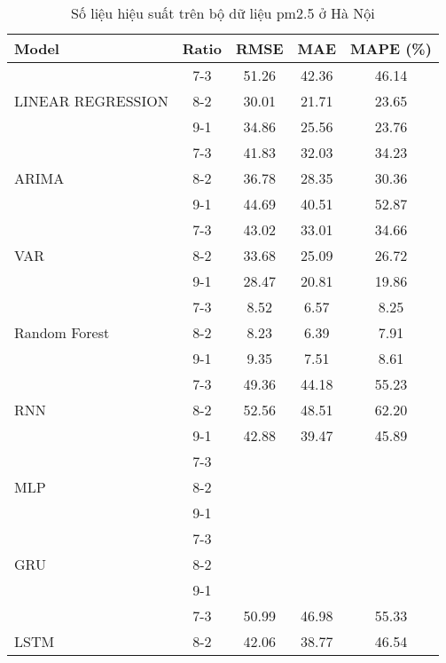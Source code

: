 \begin{table}[h!]
    \centering
    \caption{Số liệu hiệu suất trên bộ dữ liệu pm2.5 ở Hà Nội}
    \begin{tabular}{|l|c|c|c|c|}
    \hline
    \rowcolor{orange!30} \textbf{Model} & \textbf{Ratio} & \textbf{RMSE} & \textbf{MAE} & \textbf{MAPE (\%)} \\ \hline
    \rowcolor{white}  & 7-3 & 51.26 & 42.36 & 46.14 \\ 
    \rowcolor{white}  LINEAR REGRESSION & 8-2 & 30.01 & 21.71 & 23.65 \\ 
    \rowcolor{white}  & 9-1 & 34.86 & 25.56 & 23.76 \\ \hline
    \rowcolor{white}  & 7-3 & 41.83 & 32.03 & 34.23 \\ 
    \rowcolor{white} ARIMA & 8-2 & 36.78 & 28.35 & 30.36 \\ 
    \rowcolor{white}  & 9-1 & 44.69 & 40.51 & 52.87 \\ \hline
    \rowcolor{white}  & 7-3 & 43.02 & 33.01 & 34.66 \\ 
    \rowcolor{white} VAR & 8-2 & 33.68 & 25.09 & 26.72 \\ 
    \rowcolor{white}  & 9-1 & 28.47 & 20.81 & 19.86 \\ \hline
    \rowcolor{white} & 7-3 & 8.52 & 6.57 & 8.25 \\ 
    \rowcolor{white} Random Forest & 8-2 & 8.23 & 6.39 & 7.91 \\ 
    \rowcolor{white} & 9-1 & 9.35 & 7.51 & 8.61 \\ \hline
    \rowcolor{white}  & 7-3 & 49.36 & 44.18 & 55.23 \\ 
    \rowcolor{white} RNN & 8-2 & 52.56 & 48.51 & 62.20 \\
    \rowcolor{white}  & 9-1 & 42.88 & 39.47 & 45.89 \\ \hline
    \rowcolor{white} & 7-3 &  &  &  \\ 
    \rowcolor{white} MLP & 8-2 &  &  &  \\ 
    \rowcolor{white} & 9-1 &  &  &  \\ \hline
    \rowcolor{white} & 7-3 &  &  &  \\ 
    \rowcolor{white} GRU & 8-2 &  &  &  \\ 
    \rowcolor{white} & 9-1 &  &  &  \\ \hline
    \rowcolor{white}  & 7-3 & 50.99 & 46.98 & 55.33 \\ 
    \rowcolor{white} LSTM & 8-2 & 42.06 & 38.77 & 46.54 \\ 

\end{tabular}
\end{table}

